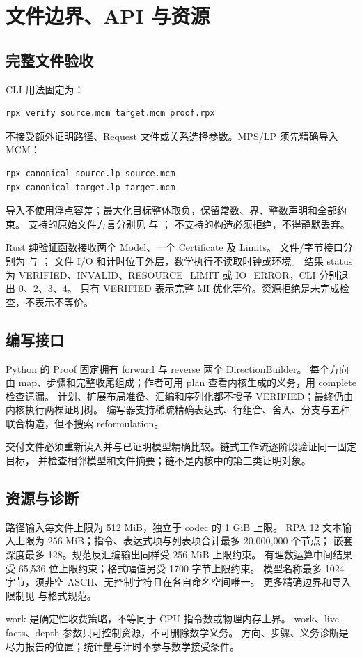 \chapter{文件边界、API 与资源}
\label{ch:loader}

\section{完整文件验收}
CLI 用法固定为：
\begin{lstlisting}
rpx verify source.mcm target.mcm proof.rpx
\end{lstlisting}
不接受额外证明路径、Request 文件或关系选择参数。MPS/LP 须先精确导入 MCM：
\begin{lstlisting}
rpx canonical source.lp source.mcm
rpx canonical target.lp target.mcm
\end{lstlisting}
导入不使用浮点容差；最大化目标整体取负，保留常数、界、整数声明和全部约束。
支持的原始文件方言分别见  与 ；
不支持的构造必须拒绝，不得静默丢弃。

Rust 纯验证函数接收两个 Model、一个 Certificate 及 Limits。
文件/字节接口分别为  与 ；
文件 I/O 和计时位于外层，数学执行不读取时钟或环境。
结果 status 为 VERIFIED、INVALID、RESOURCE\_LIMIT 或 IO\_ERROR，CLI 分别退出 0、2、3、4。
只有 VERIFIED 表示完整 MI 优化等价。资源拒绝是未完成检查，不表示不等价。

\section{编写接口}
Python 的 Proof 固定拥有 forward 与 reverse 两个 DirectionBuilder。
每个方向由 map、步骤和完整收尾组成；作者可用 plan 查看内核生成的义务，用 complete 检查遗漏。
计划、扩展布局准备、汇编和序列化都不授予 VERIFIED；最终仍由内核执行两棵证明树。
编写器支持稀疏精确表达式、行组合、舍入、分支与五种联合构造，但不搜索 reformulation。

交付文件必须重新读入并与已证明模型精确比较。链式工作流逐阶段验证同一固定目标，
并检查相邻模型和文件摘要；链不是内核中的第三类证明对象。

\section{资源与诊断}
路径输入每文件上限为 512 MiB，独立于 codec 的 1 GiB 上限。
RPA 12 文本输入上限为 256 MiB；指令、表达式项与列表项合计最多 20,000,000 个节点；
嵌套深度最多 128。规范反汇编输出同样受 256 MiB 上限约束。
有理数运算中间结果受 65,536 位上限约束；格式幅值另受 1700 字节上限约束。
模型名称最多 1024 字节，须非空 ASCII、无控制字符且在各自命名空间唯一。
更多精确边界和导入限制见  与格式规范。

work 是确定性收费策略，不等同于 CPU 指令数或物理内存上界。
work、live-facts、depth 参数只可控制资源，不可删除数学义务。
方向、步骤、义务诊断是尽力报告的位置；统计量与计时不参与数学接受条件。
